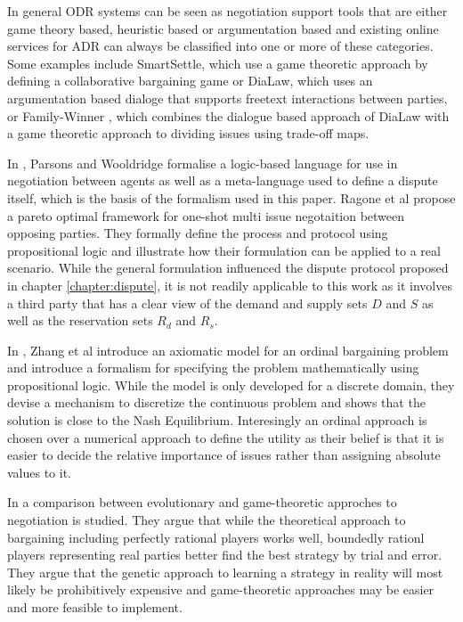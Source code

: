 \documentclass[12pt,msc,a4paper,oneside]{ucl_thesis}
\begin{document}
In general ODR systems can be seen as negotiation support tools that are either game theory based, heuristic based or argumentation based \cite{Rahwan:2003:AN:1030328.1030332} and existing online services for ADR can always be classified into one or more of these categories. Some examples include SmartSettle, which use a game theoretic approach by defining a collaborative bargaining game \cite{thiessen2003mobile} or DiaLaw, which uses an argumentation based dialoge that supports freetext interactions between parties, or Family-Winner \cite{Bellucci:2004:IAI:1032651.1033678}, which combines the dialogue based approach of DiaLaw with a game theoretic approach to dividing issues using trade-off maps.

In \cite{Wooldridge:2000:LN:3006433.3006516}, Parsons and Wooldridge formalise a logic-based language for use in negotiation between agents as well as a meta-language used to define a dispute itself, which is the basis of the formalism used in this paper. Ragone et al \cite{Ragone:2006:PAO:1124566.1124569} propose a pareto optimal framework for one-shot multi issue negotaition between opposing parties. They formally define the process and protocol using propositional logic and illustrate how their formulation can be applied to a real scenario. While the general formulation influenced the dispute protocol proposed in chapter \ref{chapter:dispute}, it is not readily applicable to this work as it involves a third party that has a clear view of the demand and supply sets $D$ and $S$ as well as the reservation sets $R_d$ and $R_s$.

In \cite{DBLP:journals:corr:ZhangZ14a}, Zhang et al introduce an axiomatic model for an ordinal bargaining problem and introduce a formalism for specifying the problem mathematically using propositional logic. While the model is only developed for a discrete domain, they devise a mechanism to discretize the continuous problem and shows that the solution is close to the Nash Equilibrium. Interesingly an ordinal approach is chosen over a numerical approach to define the utility as their belief is that it is easier to decide the relative importance of issues rather than assigning absolute values to it.

In \cite{fatima2005comparative} a comparison between evolutionary and game-theoretic approches to negotiation is studied. They argue that while the theoretical approach to bargaining including perfectly rational players works well, boundedly rationl players representing real parties better find the best strategy by trial and error. They argue that the genetic approach to learning a strategy in reality will most likely be prohibitively expensive and game-theoretic approaches may be easier and more feasible to implement.
\end{document}
